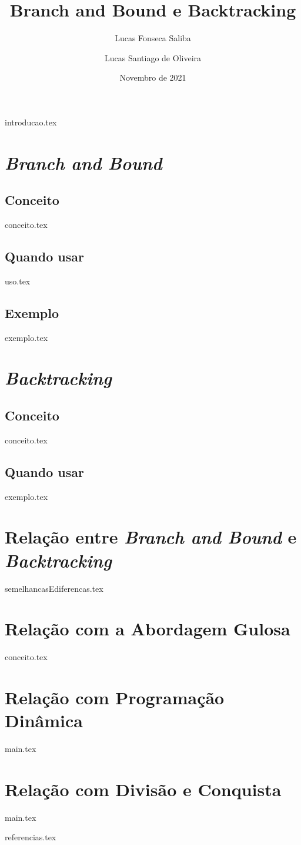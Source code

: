 \documentclass{article}
\title{Branch and Bound e Backtracking}
\author{Lucas Fonseca Saliba \and Lucas Santiago de Oliveira}
\date{Novembro de 2021}
\begin{document}
\maketitle
\vspace{1cm}
\tableofcontents
\newpage

{introducao.tex}

\section{\emph{Branch and Bound}}
\subsection{Conceito}
{conceito.tex}

\subsection{Quando usar}
{uso.tex}

\subsection{Exemplo}
{exemplo.tex}

\section{\emph{Backtracking}}
\subsection{Conceito}
{conceito.tex}

\subsection{Quando usar}
{exemplo.tex}

\section{Relação entre \emph{Branch and Bound} e \emph{Backtracking}}
{semelhancasEdiferencas.tex}

\section{Relação com a Abordagem Gulosa}
{conceito.tex}

\section{Relação com Programação Dinâmica}
{main.tex}

\section{Relação com Divisão e Conquista}
{main.tex}

{referencias.tex}
\end{document}
